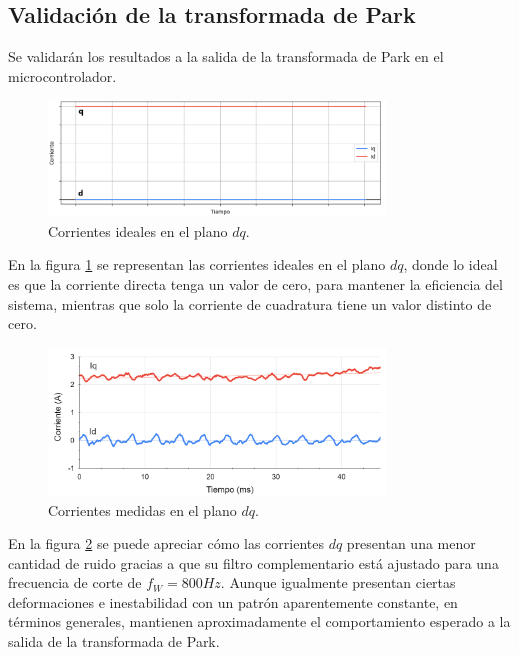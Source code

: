 \documentclass[11pt]{report}
\begin{document}
\newpage
\subsection{Validación de la transformada de Park}

Se validarán los resultados a la salida de la transformada de Park en el microcontrolador.

\begin{figure}[ht]
	\centering
	\includegraphics[width=0.8\textwidth]{imagenes/graficas/Corrientes_dq_ideal.png}
	\caption{Corrientes ideales en el plano $dq$.}
	\label{corrientes_dq_ideal}
\end{figure}
\FloatBarrier

En la figura \ref{corrientes_dq_ideal} se representan las corrientes ideales en el plano $dq$, donde lo ideal es que la corriente directa tenga un valor de cero, para mantener la eficiencia del sistema, mientras que solo la corriente de cuadratura tiene un valor distinto de cero.

\begin{figure}[ht]
	\centering
	\includegraphics[width=0.8\textwidth]{imagenes/graficas/Corrientes_dq.png}
	\caption{Corrientes medidas en el plano $dq$.}
	\label{corrientes_dq}
\end{figure}
\FloatBarrier

En la figura \ref{corrientes_dq} se puede apreciar cómo las corrientes $dq$ presentan una menor cantidad de ruido gracias a que su filtro complementario está ajustado para una frecuencia de corte de $f_W=800Hz$. Aunque igualmente presentan ciertas deformaciones e inestabilidad con un patrón aparentemente constante, en términos generales, mantienen aproximadamente el comportamiento esperado a la salida de la transformada de Park.
\end{document}
